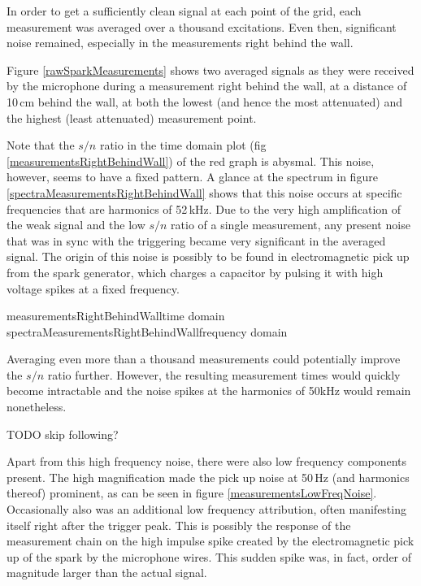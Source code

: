 In order to get a sufficiently clean signal at each point of the grid, each measurement was averaged over a thousand excitations. Even then, significant noise remained, especially in the measurements right behind the wall.

Figure \ref{rawSparkMeasurements} shows two averaged signals as they were received by the microphone during a measurement right behind the wall, at a distance of 10\,cm behind the wall, at both the lowest (and hence the most attenuated) and the highest (least attenuated) measurement point.

Note that the $s/n$ ratio in the time domain plot (fig \ref{measurementsRightBehindWall}) of the red graph is abysmal. This noise, however, seems to have a fixed pattern. A glance at the spectrum in figure \ref{spectraMeasurementsRightBehindWall} shows that this noise occurs at specific frequencies that are harmonics of 52\,kHz. Due to the very high amplification of the weak signal and the low $s/n$ ratio of a single measurement, any present noise that was in sync with the triggering became very significant in the averaged signal. The origin of this noise is possibly to be found in electromagnetic pick up from the spark generator, which charges a capacitor by pulsing it with high voltage spikes at a fixed frequency.


	{measurementsRightBehindWall}{time domain}
	{spectraMeasurementsRightBehindWall}{frequency domain}

Averaging even more than a thousand measurements could potentially improve the $s/n$ ratio further. However, the resulting measurement times would quickly become intractable and the noise spikes at the harmonics of 50kHz would remain nonetheless.


TODO skip following?

Apart from this high frequency noise, there were also low frequency components present. The high magnification made the pick up noise at 50\,Hz (and harmonics thereof) prominent, as can be seen in figure \ref{measurementsLowFreqNoise}. Occasionally also was an additional low frequency attribution, often manifesting itself right after the trigger peak. This is possibly the response of the measurement chain on the high impulse spike created by the electromagnetic pick up of the spark by the microphone wires. This sudden spike was, in fact, order of magnitude larger than the actual signal.

